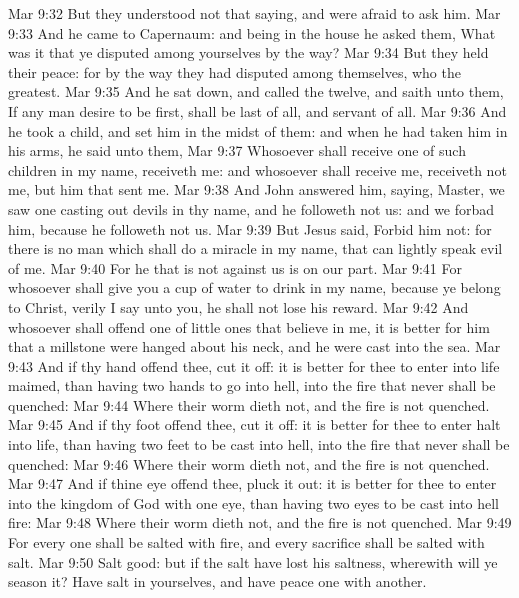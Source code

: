 \vs Mar 9:32 But they understood not that saying, and were afraid to ask him.
\vs Mar 9:33 And he came to Capernaum: and being in the house he asked them, What was it that ye disputed among yourselves by the way?
\vs Mar 9:34 But they held their peace: for by the way they had disputed among themselves, who  the greatest.
\vs Mar 9:35 And he sat down, and called the twelve, and saith unto them, If any man desire to be first,  shall be last of all, and servant of all.
\vs Mar 9:36 And he took a child, and set him in the midst of them: and when he had taken him in his arms, he said unto them,
\vs Mar 9:37 Whosoever shall receive one of such children in my name, receiveth me: and whosoever shall receive me, receiveth not me, but him that sent me.
\vs Mar 9:38 And John answered him, saying, Master, we saw one casting out devils in thy name, and he followeth not us: and we forbad him, because he followeth not us.
\vs Mar 9:39 But Jesus said, Forbid him not: for there is no man which shall do a miracle in my name, that can lightly speak evil of me.
\vs Mar 9:40 For he that is not against us is on our part.
\vs Mar 9:41 For whosoever shall give you a cup of water to drink in my name, because ye belong to Christ, verily I say unto you, he shall not lose his reward.
\vs Mar 9:42 And whosoever shall offend one of  little ones that believe in me, it is better for him that a millstone were hanged about his neck, and he were cast into the sea.
\vs Mar 9:43 And if thy hand offend thee, cut it off: it is better for thee to enter into life maimed, than having two hands to go into hell, into the fire that never shall be quenched:
\vs Mar 9:44 Where their worm dieth not, and the fire is not quenched.
\vs Mar 9:45 And if thy foot offend thee, cut it off: it is better for thee to enter halt into life, than having two feet to be cast into hell, into the fire that never shall be quenched:
\vs Mar 9:46 Where their worm dieth not, and the fire is not quenched.
\vs Mar 9:47 And if thine eye offend thee, pluck it out: it is better for thee to enter into the kingdom of God with one eye, than having two eyes to be cast into hell fire:
\vs Mar 9:48 Where their worm dieth not, and the fire is not quenched.
\vs Mar 9:49 For every one shall be salted with fire, and every sacrifice shall be salted with salt.
\vs Mar 9:50 Salt  good: but if the salt have lost his saltness, wherewith will ye season it? Have salt in yourselves, and have peace one with another.
